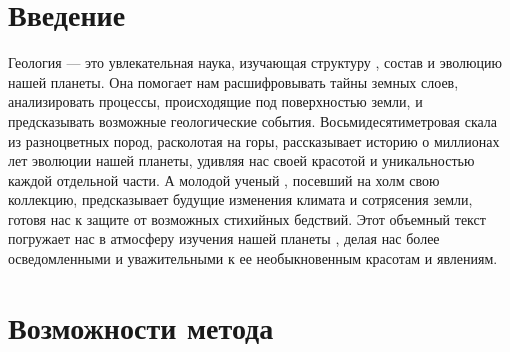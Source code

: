 \documentclass{esdiploma}
\begin{document}


\maketitle

\tableofcontents

\newcommand{\upb}{$^{238}U/^{206}Pb$} %

\chapter*{Введение}
Геология --- это увлекательная наука, изучающая структуру \citep{korolyuk1960}, состав и эволюцию нашей планеты. Она помогает нам расшифровывать тайны земных слоев, анализировать процессы, происходящие под поверхностью земли, и предсказывать возможные геологические события. Восьмидесятиметровая скала \citep{Shukolyukov1974} из разноцветных пород, расколотая на горы, рассказывает историю о миллионах лет эволюции нашей планеты, удивляя нас своей красотой и уникальностью каждой отдельной части. А молодой ученый \citep{Roberts2020}, посевший на холм свою коллекцию, предсказывает будущие изменения климата и сотрясения земли, готовя нас к защите от возможных стихийных бедствий. Этот объемный текст погружает нас в атмосферу изучения нашей планеты , делая нас более осведомленными и уважительными к ее необыкновенным красотам и явлениям.

\chapter{Возможности метода}
\end{document}

